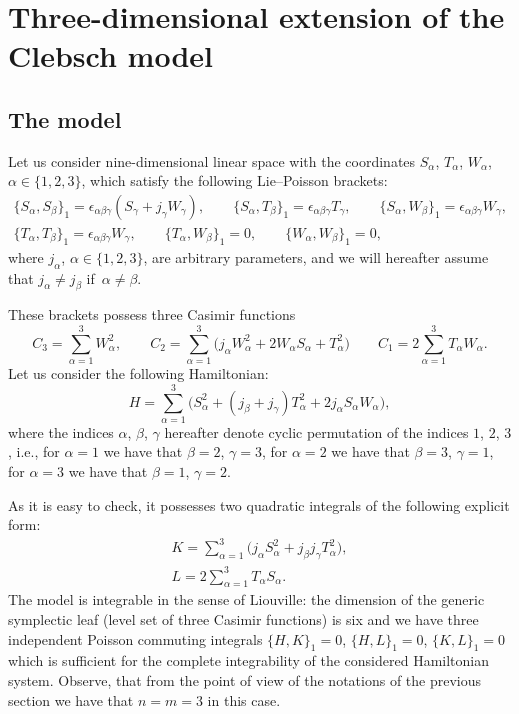 \documentclass[pdftex]{sigma}
\def\a{\alpha}
\def\b{\beta}
\def\g{\gamma}
\def\e{\epsilon}
\numberwithin{equation}{section}
\begin{document}
\section{Three-dimensional extension of the Clebsch model}\label{sec3}
\subsection{The model}
Let us consider nine-dimensional linear space with the
coordinates $S_{\a}$, $T_{\a}$, $W_{\a}$, $\a\in \{1,2,3\}$, which satisfy the
 following Lie--Poisson brackets:
 \begin{subequations}\label{e3lpb}
\begin{gather}
\{ S_{\a}, S_{\b}\}_1=\e_{\a\b\g}(S_{\g}+ j_{\g} W_{\g}), \qquad \{ S_{\a},
T_{\b}\}_1=\e_{\a\b\g}T_{\g},\qquad \{ S_{\a}, W_{\b}\}_1= \e_{\a\b\g} W_{\g},\label{e3lpb1}
\\
\{ T_{\a}, T_{\b}\}_1=\e_{\a\b\g} W_{\g}, \qquad \{ T_{\a},
W_{\b}\}_1=0,\qquad \{ W_{\a}, W_{\b}\}_1= 0,\label{e3lpb2}
\end{gather}
\end{subequations}
where $j_{\a}$, $\a\in \{1,2,3\}$, are arbitrary parameters, and we will hereafter assume
 that $j_{\a}\neq j_{\b}$ if~${\a\neq \b}$.

These brackets possess three Casimir functions
\begin{equation}\label{casimir}
C_3= \sum_{\a=1}^3 W^2_{\a},\qquad C_2= \sum_{\a=1}^3 \big(j_{\a} W^2_{\a} + 2 W_{\a}S_{\a} +T_{\a}^2 \big) \qquad C_1= 2\sum_{\a=1}^3T_{\a}W_{\a}.
\end{equation}
Let us consider the following Hamiltonian:
\begin{equation}\label{h}
H =\sum\limits_{\a=1}^3 \big(S_{\a}^2+ (j_{\b}+j_{\g}) T^2_{\a}+ 2 j_{\a} S_{\a} W_{\a}\big),
\end{equation}
where the indices $\a$, $\b$, $\g$ hereafter denote cyclic permutation of the indices $1$, $2$, $3$, i.e., for $\a=1$ we have that $\b=2$, $\g=3$, for $\a=2$ we have that $\b=3$, $\g=1$, for $\a=3$ we have that $\b=1$, $\g=2$.

As it is easy to check, it possesses two quadratic integrals
 of the following explicit form:
\begin{gather}
K= \sum\limits_{\a=1}^3 \big(j_{\a} S_{\a}^2+ j_{\b}j_{\g} T^2_{\a}\big), \label{k}
\\
L=2\sum_{\a=1}^3T_{\a}S_{\a}.\label{l}
\end{gather}
The model is integrable in the sense of Liouville: the dimension
of the generic symplectic leaf (level set of three Casimir
functions) is six and we have three independent Poisson commuting integrals
$\{H,K\}_1=0$, $ \{H,L\}_1=0$, $ \{K,L\}_1=0$
which is sufficient for the complete integrability of the
considered Hamiltonian system. Observe, that from the point of
view of the notations of the previous section we have that $n=m=3$ in this case.
\end{document}
